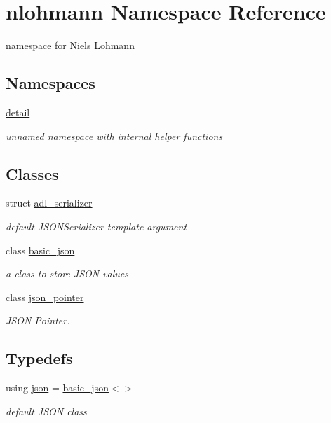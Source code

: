 \hypertarget{namespacenlohmann}{}\section{nlohmann Namespace Reference}
\label{namespacenlohmann}


namespace for Niels Lohmann  


\subsection*{Namespaces}
\begin{DoxyCompactItemize}
\item 
 \mbox{\hyperlink{namespacenlohmann_1_1detail}{detail}}
\begin{DoxyCompactList}\small\item\em unnamed namespace with internal helper functions \end{DoxyCompactList}\end{DoxyCompactItemize}
\subsection*{Classes}
\begin{DoxyCompactItemize}
\item 
struct \mbox{\hyperlink{structnlohmann_1_1adl__serializer}{adl\+\_\+serializer}}
\begin{DoxyCompactList}\small\item\em default J\+S\+O\+N\+Serializer template argument \end{DoxyCompactList}\item 
class \mbox{\hyperlink{classnlohmann_1_1basic__json}{basic\+\_\+json}}
\begin{DoxyCompactList}\small\item\em a class to store J\+S\+ON values \end{DoxyCompactList}\item 
class \mbox{\hyperlink{classnlohmann_1_1json__pointer}{json\+\_\+pointer}}
\begin{DoxyCompactList}\small\item\em J\+S\+ON Pointer. \end{DoxyCompactList}\end{DoxyCompactItemize}
\subsection*{Typedefs}
\begin{DoxyCompactItemize}
\item 
using \mbox{\hyperlink{namespacenlohmann_a2bfd99e845a2e5cd90aeaf1b1431f474}{json}} = \mbox{\hyperlink{classnlohmann_1_1basic__json}{basic\+\_\+json}}$<$$>$
\begin{DoxyCompactList}\small\item\em default J\+S\+ON class \end{DoxyCompactList}\end{DoxyCompactItemize}
